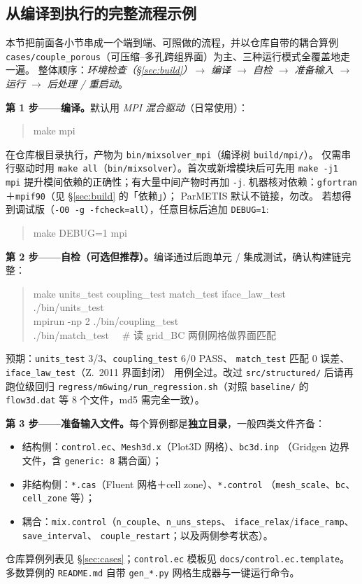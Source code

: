 \documentclass[11pt,a4paper]{ctexart}
\begin{document}
\subsection{从编译到执行的完整流程示例}\label{sec:workflow}

本节把前面各小节串成一个端到端、可照做的流程，并以仓库自带的耦合算例
\texttt{cases/couple\_porous}（可压缩--多孔跨组界面）为主、三种运行模式全覆盖地走一遍。
整体顺序：\emph{环境检查（\S\ref{sec:build}）$\to$ 编译 $\to$ 自检 $\to$ 准备输入 $\to$
运行 $\to$ 后处理 / 重启动}。

\textbf{第 1 步——编译。}默认用 \emph{MPI 混合驱动}（日常使用）：
\begin{quote}\ttfamily\small
make mpi
\end{quote}
在仓库根目录执行，产物为 \texttt{bin/mixsolver\_mpi}（编译树 \texttt{build/mpi/}）。
仅需串行驱动时用 \texttt{make all}（\texttt{bin/mixsolver}）。首次或新增模块后可先用
\texttt{make -j1 mpi} 提升模间依赖的正确性；有大量中间产物时再加 \texttt{-j}.
机器核对依赖：\texttt{gfortran}＋\texttt{mpif90}（见 \S\ref{sec:build} 的「依赖」）；
ParMETIS 默认不链接，勿改。
若想得到调试版（\texttt{-O0 -g -fcheck=all}），任意目标后追加 \texttt{DEBUG=1}:
\begin{quote}\ttfamily\small
make DEBUG=1 mpi
\end{quote}

\textbf{第 2 步——自检（可选但推荐）。}编译通过后跑单元 / 集成测试，确认构建链完整：
\begin{quote}\ttfamily\small
make units\_test coupling\_test match\_test iface\_law\_test\\
./bin/units\_test\\
mpirun -np 2 ./bin/coupling\_test\\
./bin/match\_test \ \ \# 读 grid\_BC 两侧网格做界面匹配
\end{quote}
预期：\texttt{units\_test} 3/3、\texttt{coupling\_test} 6/0 PASS、
\texttt{match\_test} 匹配 0 误差、\texttt{iface\_law\_test}（Z.~2011 界面封闭）
用例全过。改过 \texttt{src/structured/} 后请再跑位级回归
\texttt{regress/m6wing/run\_regression.sh}（对照 \texttt{baseline/} 的
\texttt{flow3d.dat} 等 8 个文件，md5 需完全一致）。

\textbf{第 3 步——准备输入文件。}每个算例都是\textbf{独立目录}，一般四类文件齐备：
\begin{itemize}\itemsep2pt
  \item 结构侧：\texttt{control.ec}、\texttt{Mesh3d.x}（Plot3D 网格）、\texttt{bc3d.inp}
        （Gridgen 边界文件，含 \texttt{generic: 8} 耦合面）；
  \item 非结构侧：\texttt{*.cas}（Fluent 网格＋cell zone）、\texttt{*.control}
        （\texttt{mesh\_scale}、\texttt{bc}、\texttt{cell\_zone} 等）；
  \item 耦合：\texttt{mix.control}（\texttt{n\_couple}、\texttt{n\_uns\_steps}、
        \texttt{iface\_relax}/\texttt{iface\_ramp}、\texttt{save\_interval}、
        \texttt{couple\_restart}；以及两侧参考状态）。
\end{itemize}
仓库算例列表见 \S\ref{sec:cases}；\texttt{control.ec} 模板见
\texttt{docs/control.ec.template}。多数算例的 \texttt{README.md} 自带
\texttt{gen\_*.py} 网格生成器与一键运行命令。
\end{document}
